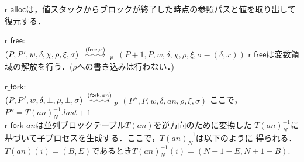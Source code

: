 \documentclass[submit,PRO]{ipsj}
\makeatletter
\newcommand{\longsquiggly}{\xymatrix{{}\ar@{~>}[r]&{}}}
\newcommand{\bcode}[1]{$\mathsf{#1}$}
\newcommand{\brightarrow}[1]{\stackrel{#1}{\longsquiggly}}
\makeatother
\begin{document}
\begin{list}
\bcode{r\_alloc}は，値スタックからブロックが終了した時点の参照パスと値を取り出して復元する．
\item \bcode{r\_free}:\\
$(P,P',w,\delta,\chi,\rho,\xi,\sigma)\brightarrow{(\mathsf{free},x)}_p$\newline
\qquad $(P+1,P,w,\delta,\chi,\rho,\xi,\sigma-(\delta,x))$\newline
\bcode{r\_free}は変数領域の解放を行う．($\rho$への書き込みは行わない．)
\item \bcode{r\_fork}:\\
$(P,P',w,\delta,\bot,\rho,\bot,\sigma)\brightarrow{(\mathsf{fork},an)}_p$\newline
\qquad $(P'',P,w,\delta,an,\rho,\xi,\sigma)$\newline
ここで，$P''=T(an)^{-1}_N.last+1$\\
\bcode{r\_fork} $an$は並列ブロックテーブル$T(an)$を逆方向のために変換した
$T(an)^{-1}_N$に基づいて子プロセスを生成する．ここで，$T(an)^{-1}_N$は以下のように
得られる．
$T(an)(i)=(B,E)$であるとき$T(an)^{-1}_N(i)=(N+1-E,N+1-B)$.

\end{list}
\end{document}

